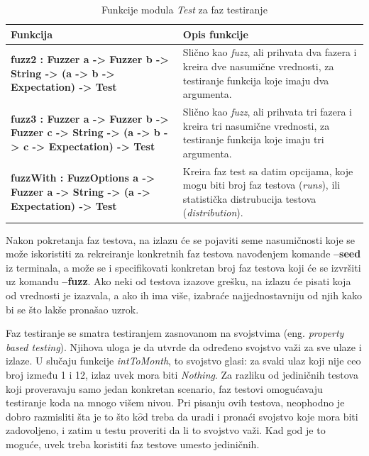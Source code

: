 \documentclass[12pt,oneside]{memoir}
\begin{document}
\begin{table}[!htbp]
\centering
\caption{Funkcije modula \emph{Test} za faz testiranje}
\label{tab:fuzzer}
\begin{center}
\begin{tabular}{ | m{10cm} | m{10em} | } 
 \hline
\textbf{Funkcija} &  \textbf{Opis funkcije} \\ 
  \hline
 \small{\textbf{fuzz2 : Fuzzer a -> Fuzzer b -> String -> (a -> b -> Expectation) -> Test}} & \small{Slično kao \emph{fuzz}, ali prihvata dva fazera i kreira dve nasumične vrednosti, za testiranje funkcija koje imaju dva argumenta.} \\ 
  \hline
   \small{\textbf{fuzz3 :
    Fuzzer a
    -> Fuzzer b
    -> Fuzzer c
    -> String
    -> (a -> b -> c -> Expectation)
    -> Test}} & \small{Slično kao \emph{fuzz}, ali prihvata tri fazera i kreira tri nasumične vrednosti, za testiranje funkcija koje imaju tri argumenta.} \\ 
  \hline
 \small{\textbf{fuzzWith : FuzzOptions a -> Fuzzer a -> String -> (a -> Expectation) -> Test}} & \small{Kreira faz test sa datim opcijama, koje mogu biti broj faz testova (\textit{runs}), ili statistička distrubucija testova (\textit{distribution}).}  \\ 
\hline

\end{tabular}
\end{center}
\end{table}

\par Nakon pokretanja faz testova, na izlazu će se pojaviti seme nasumičnosti koje se može iskoristiti za rekreiranje konkretnih faz testova navođenjem komande \textbf{--seed} iz terminala, a može se i specifikovati konkretan broj faz testova koji će se izvršiti uz komandu \textbf{--fuzz}. Ako neki od testova izazove grešku, na izlazu će pisati koja od vrednosti je izazvala, a ako ih ima više, izabraće najjednostavniju od njih kako bi se što lakše pronašao uzrok.
\par Faz testiranje se smatra testiranjem zasnovanom na svojstvima (eng. \emph{property based testing}). Njihova uloga je da utvrde da određeno svojstvo važi za sve ulaze i izlaze. U slučaju funkcije \emph{intToMonth}, to svojstvo glasi: za svaki ulaz koji nije ceo broj između 1 i 12, izlaz uvek mora biti \emph{Nothing}. Za razliku od jediničnih testova koji proveravaju samo jedan konkretan scenario, faz testovi omogućavaju testiranje koda na mnogo višem nivou. Pri pisanju ovih testova, neophodno je dobro razmisliti šta je to što k$\hat{o}$d treba da uradi i pronaći svojstvo koje mora biti zadovoljeno, i zatim u testu proveriti da li to svojstvo važi. Kad god je to moguće, uvek treba koristiti faz testove umesto jediničnih. 
\end{document}
